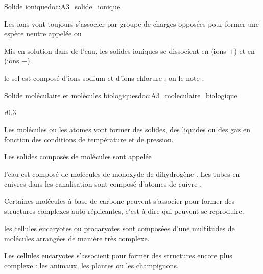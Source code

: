 \begin{doc}{Solide ionique}{doc:A3_solide_ionique}
  \begin{encart}
    Les ions vont toujours s'associer par groupe de charges opposées pour former une espèce neutre appelée  ou 
  \end{encart}
  
  Mis en solution dans de l'eau, les solides ioniques se dissocient en  (ions $+$) et en  (ions $-$).
  
  \exemple le sel est composé d'ions sodium  et d'ions chlorure , on le note .
\end{doc}



\begin{doc}{Solide moléculaire et molécules biologiques}{doc:A3_moleculaire_biologique}
  \vspace*{-16pt}
  \begin{wrapfigure}{r}{0.3\linewidth}
    \vspace*{-22pt}
    \centering
  
  \end{wrapfigure}
  \phantom{bla}
  
  \begin{encart}
    Les molécules ou les atomes vont former des solides, des liquides ou des gaz en fonction des conditions de température et de pression.

    Les solides composés de molécules sont appelée 
  \end{encart}
  \exemple l'eau est composé de molécules de monoxyde de dihydrogène .
  Les tubes en cuivres dans les canalisation sont composé d'atomes de cuivre .
  
  \begin{encart}
    Certaines molécules à base de carbone peuvent s'associer pour former des structures complexes auto-réplicantes, c'est-à-dire qui peuvent se reproduire.
  \end{encart}
  \exemple les cellules eucaryotes ou procaryotes sont composées d'une multitudes de molécules arrangées de manière très complexe.

  \begin{encart}
    Les cellules eucaryotes s'associent pour former des structures encore plus complexe : les animaux, les plantes ou les champignons.
  \end{encart}
\end{doc}